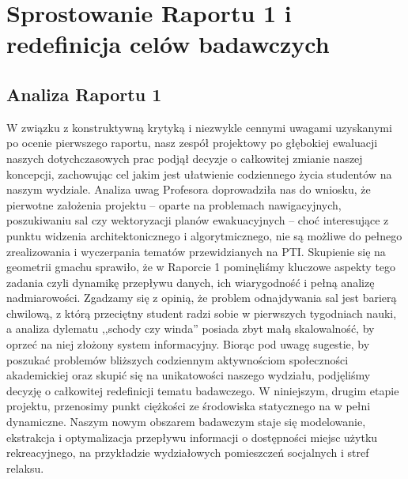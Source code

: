 \documentclass[14pt,a4paper]{extarticle}
\begin{document}
\section{Sprostowanie Raportu 1 i redefinicja celów badawczych}
\subsection{Analiza Raportu 1}
W związku z konstruktywną krytyką i niezwykle cennymi uwagami uzyskanymi po ocenie pierwszego raportu, nasz zespół projektowy po głębokiej ewaluacji naszych dotychczasowych prac podjął decyzje o całkowitej zmianie naszej koncepcji, zachowując cel jakim jest ułatwienie codziennego życia studentów na naszym wydziale. Analiza uwag Profesora doprowadziła nas do wniosku, że pierwotne założenia projektu -- oparte na problemach nawigacyjnych, poszukiwaniu sal czy wektoryzacji planów ewakuacyjnych -- choć interesujące z punktu widzenia architektonicznego i algorytmicznego, nie są możliwe do pełnego zrealizowania i wyczerpania tematów przewidzianych na PTI. Skupienie się na geometrii gmachu sprawiło, że w Raporcie 1 pominęliśmy kluczowe aspekty tego zadania czyli dynamikę przepływu danych, ich wiarygodność i pełną analizę nadmiarowości. Zgadzamy się z opinią, że problem odnajdywania sal jest barierą chwilową, z którą przeciętny student radzi sobie w pierwszych tygodniach nauki, a analiza dylematu ,,schody czy winda'' posiada zbyt małą skalowalność, by oprzeć na niej złożony system informacyjny. Biorąc pod uwagę sugestie, by poszukać problemów bliższych codziennym aktywnościom społeczności akademickiej oraz skupić się na unikatowości naszego wydziału, podjęliśmy decyzję o całkowitej redefinicji tematu badawczego. W niniejszym, drugim etapie projektu, przenosimy punkt ciężkości ze środowiska statycznego na w pełni dynamiczne. Naszym nowym obszarem badawczym staje się modelowanie, ekstrakcja i optymalizacja przepływu informacji o dostępności miejsc użytku rekreacyjnego, na przykładzie wydziałowych pomieszczeń socjalnych i stref relaksu.
\end{document}
